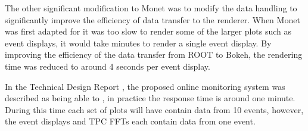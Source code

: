 The other significant modification to Monet was to modify the data handling to 
significantly improve the efficiency of data transfer to the renderer.
When Monet was first adapted for \protodune{} it was too slow to render some 
of the larger plots such as event displays, it would take minutes to render a 
single event display. By improving the efficiency of the data transfer from ROOT
to Bokeh, the rendering time was reduced to around 4 seconds per event display.

\bigskip

In the \protodune{} Technical Design Report \cite{Abi2017}, the proposed online
monitoring system was described as being able to , in practice the response time is around one minute.
During this time each set of plots will have contain data from 10 events, 
however, the event displays and TPC FFTs each contain data from one event.

